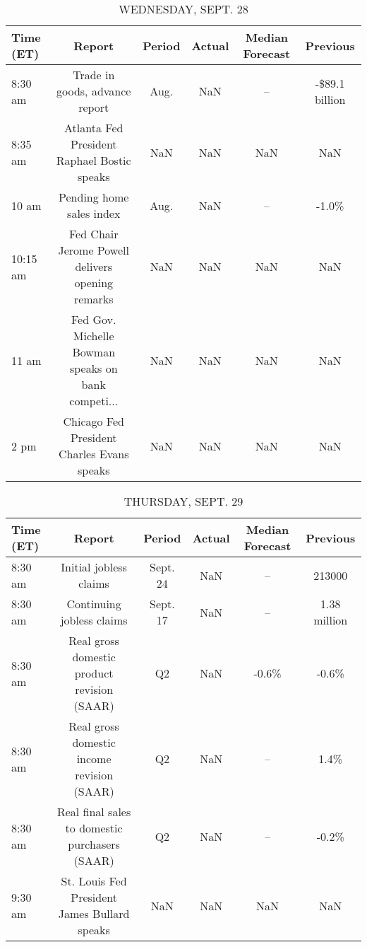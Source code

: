 \documentclass{book}
\begin{document}
  
  \begin{table}[htbp]%
  \caption{WEDNESDAY, SEPT. 28}%
  \centering%
  \begin{adjustbox}{width=1\textwidth}%
  \begin{tabular}{lccccc}
  \toprule
  Time (ET) &                                             Report & Period & Actual & Median Forecast &       Previous \\
  \midrule
    8:30 am &                     Trade in goods, advance report &   Aug. &    NaN &              -- & -\$89.1 billion \\
    8:35 am &        Atlanta Fed President Raphael Bostic speaks &    NaN &    NaN &             NaN &            NaN \\
      10 am &                           Pending home sales index &   Aug. &    NaN &              -- &          -1.0\% \\
   10:15 am &   Fed Chair Jerome Powell delivers opening remarks &    NaN &    NaN &             NaN &            NaN \\
      11 am & Fed Gov. Michelle Bowman speaks on bank competi... &    NaN &    NaN &             NaN &            NaN \\
       2 pm &         Chicago Fed President Charles Evans speaks &    NaN &    NaN &             NaN &            NaN \\
  \bottomrule
  \end{tabular}
  \end{adjustbox}%
  \end{table}
  
  
  
  \begin{table}[htbp]%
  \caption{THURSDAY, SEPT. 29}%
  \centering%
  \begin{adjustbox}{width=1\textwidth}%
  \begin{tabular}{lccccc}
  \toprule
  Time (ET) &                                         Report &   Period & Actual & Median Forecast &     Previous \\
  \midrule
    8:30 am &                         Initial jobless claims & Sept. 24 &    NaN &              -- &       213000 \\
    8:30 am &                      Continuing jobless claims & Sept. 17 &    NaN &              -- & 1.38 million \\
    8:30 am &    Real gross domestic product revision (SAAR) &       Q2 &    NaN &           -0.6\% &        -0.6\% \\
    8:30 am &     Real gross domestic income revision (SAAR) &       Q2 &    NaN &              -- &         1.4\% \\
    8:30 am & Real final sales to domestic purchasers (SAAR) &       Q2 &    NaN &              -- &        -0.2\% \\
    9:30 am &   St. Louis Fed President James Bullard speaks &      NaN &    NaN &             NaN &          NaN \\
  \bottomrule
  \end{tabular}
  \end{adjustbox}%
  \end{table}
  
\end{document}
